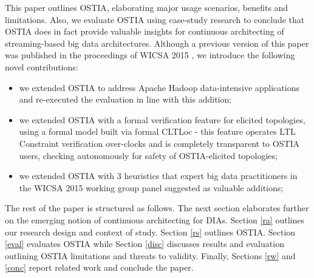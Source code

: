 This paper outlines OSTIA, elaborating major usage scenarios, benefits and limitations. Also, we evaluate OSTIA using case-study research to conclude that OSTIA does in fact provide valuable insights for continuous architecting of streaming-based big data architectures. Although a previous version of this paper was published in the proceedings of WICSA 2015 \cite{wicsabd}, we introduce the following novel contributions:
\begin{itemize}
\item we extended OSTIA to address Apache Hadoop data-intensive applications and re-executed the evaluation in line with this addition;
\item we extended OSTIA with a formal verification feature for elicited topologies, using a formal model built via formal CLTLoc - this feature operates LTL Constraint verification  over-clocks and is completely transparent to OSTIA users, checking autonomously for  safety of OSTIA-elicited topologies;
\item we extended OSTIA with 3 heuristics that expert big data practitioners in the WICSA 2015 working group panel suggested as valuable additions;
\end{itemize}

The rest of the paper is structured as follows. The next section elaborates further on the emerging notion of continuous architecting for DIAs. Section \ref{ra} outlines our research design and context of study. Section \ref{rs} outlines OSTIA. Section \ref{eval} evaluates OSTIA while Section \ref{disc} discusses results and evaluation outlining OSTIA limitations and threats to validity. Finally, Sections \ref{rw} and \ref{conc} report related work and conclude the paper.

